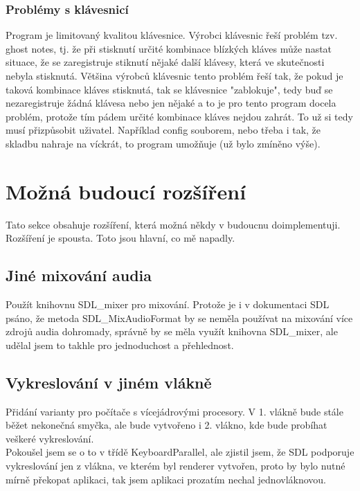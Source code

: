 \documentclass[12pt]{article}
\begin{document}
	\subsubsection{Problémy s klávesnicí}
	Program je limitovaný kvalitou klávesnice. Výrobci klávesnic řeší problém tzv. ghost notes, tj. že při stisknutí určité kombinace blízkých kláves může nastat situace, že se zaregistruje stiknutí nějaké další klávesy, která ve skutečnosti nebyla stisknutá. Většina výrobců klávesnic tento problém řeší tak, že pokud je taková kombinace kláves stisknutá, tak se klávesnice "zablokuje", tedy buď se nezaregistruje žádná klávesa nebo jen nějaké a to je pro tento program docela problém, protože tím pádem určité kombinace kláves nejdou zahrát. To už si tedy musí přizpůsobit uživatel. Například config souborem, nebo třeba i tak, že skladbu nahraje na víckrát, to program umožňuje (už bylo zmíněno výše).
	
	
	\newpage
	\maketitle\section{Možná budoucí rozšíření}	
	Tato sekce obsahuje rozšíření, která možná někdy v budoucnu doimplementuji.
	\\
	Rozšíření je spousta. Toto jsou hlavní, co mě napadly.
	\subsection{Jiné mixování audia}
	Použít knihovnu SDL\_mixer pro mixování. Protože je i v dokumentaci SDL psáno, že metoda SDL\_MixAudioFormat by se neměla používat na mixování více zdrojů audia dohromady, správně by se měla využít knihovna SDL\_mixer, ale udělal jsem to takhle pro jednoduchost a přehlednost.
	\subsection{Vykreslování v jiném vlákně}
	Přidání varianty pro počítače s vícejádrovými procesory. V 1. vlákně bude stále běžet nekonečná smyčka, ale bude vytvořeno i 2. vlákno, kde bude probíhat veškeré vykreslování.
	\\
	Pokoušel jsem se o to v třídě KeyboardParallel, ale zjistil jsem, že SDL podporuje vykreslování jen z vlákna, ve kterém byl renderer vytvořen, proto by bylo nutné mírně překopat aplikaci, tak jsem aplikaci prozatím nechal jednovláknovou.
\end{document}
